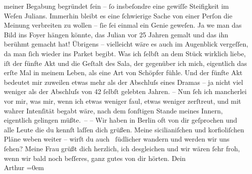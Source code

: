 \begin{ledgroupsized}[t]{13cm}
               meiner Begabung begründet ſein – ſo insbeſondre eine gewiſſe Steifigkeit im Weſen {\pb}Julians. Immerhin
               bleibt es eine ſchwierige Sache von einer Perſon die Meinung verbreiten zu wollen –
               ſie ſei einmal ein Genie geweſen. Ja we{\geminationn} man das Bild
               ins Foyer hängen könnte, das Julian vor 25 Jahren gemalt und das ihn berühmt gemacht hat! Übrigens –
               vielleicht wäre es auch im Augenblick vergeſſen, da man ſich wieder ins Parket
               begibt.\pend
           \pstart
           Was ich ſelbſt an dem Stück
               wirklich liebe, iſt der fünfte Akt und die {\pb}Geſtalt des Sala, der gegenüber ich mich,
               eigentlich das erſte Mal in meinem Leben, als eine Art von Schöpfer fühle. Und der
               fünfte Akt bedeutet mir zuweilen etwas mehr als der Abschluſs eines Dramas – ja nicht
               viel weniger als der Abschluſs von 42 ſelbſt gelebten Jahren. \introOben{}–\introOben{} Nun ſeh ich mancherlei vor mir, was mir, wenn ich etwas weniger faul,
               etwas weniger zerſtreut, und mit \strikeout{\textcolor{gray}{×}\-\textcolor{gray}{×}\-\textcolor{gray}{×}\-\textcolor{gray}{×}-} wahrer Intenſität
               begabt wäre, nach dem ſonſtigen Stande meines Innern, eigentlich gelingen
               müßte. –\pend
           \pstart
           {\pb}– Wir haben in Berlin oft von dir geſprochen und alle Leute die
               du kennſt laſſen dich grüßen. Meine sicilianiſchen und korfioliſchen Pläne
               weben weiter – wirſt du auch  ſüdlicher wandern und werden wir uns ſehen? Meine Frau grüßt dich herzlich, ich
               desgleichen und wir wären ſehr froh, wenn wir bald noch beſſeres, ganz gutes von dir
               hörten.\pend
           \pstart
           Dein{\\[\baselineskip]}\spacefill\mbox{Arthur}\pend
           \leftskip=0em{}
         
         \endnumbering{}\end{ledgroupsized}  \newcommand{\dateiname}{L01376}\newcommand{\titel}{Arthur Schnitzler an Hermann Bahr, 22. 2. 1904}\newcommand{\editorInnen}{ Kurt Ifkovits,  Martin Anton Müller}
      